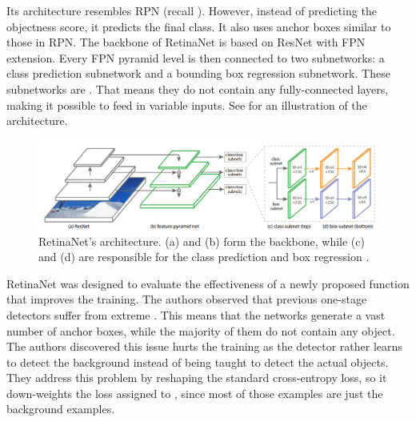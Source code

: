 Its architecture resembles RPN (recall ). However, instead
of predicting the objectness score, it predicts the final class. It also uses
anchor boxes similar to those in RPN. The backbone of RetinaNet is based on
ResNet with FPN extension. Every FPN pyramid level is then connected to two
subnetworks: a class prediction subnetwork and a bounding box regression
subnetwork. These subnetworks are . That means
they do not contain any fully-connected layers, making it possible to feed
in variable inputs. See  for an illustration
of the architecture.

\begin{figure}[h]
    \centering
    \includegraphics[width=\linewidth]{Sources/Figures/retinanet.png}
    \caption{RetinaNet's architecture. (a) and (b) form the backbone, while (c)
        and (d) are responsible for the class prediction and box regression
        \cite{retinanet}.}
    \label{fig:retinanet}
\end{figure}

RetinaNet was designed to evaluate the effectiveness of a newly proposed
 function that improves the training. The authors observed that
previous one-stage detectors \cite{yolo1, yolo2, ssd} suffer from extreme
. This means that the networks
generate a vast number of anchor boxes, while the majority of them do not
contain any object. The authors discovered this issue hurts the training as the
detector rather learns to detect the background instead of being taught to
detect the actual objects. They address this problem by reshaping the standard
cross-entropy loss, so it down-weights the loss assigned to
, since most of those examples are just the
background examples.

